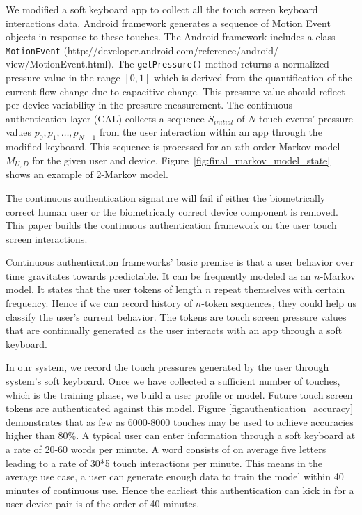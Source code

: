 \documentclass{acm_proc_article-sp}
\begin{document}
We modified a soft keyboard app to collect all the touch screen keyboard interactions data.
Android framework generates a sequence of Motion Event objects in response to these touches.
The Android framework includes a class {\tt MotionEvent} (http://developer.android.com/reference/android/\\view/MotionEvent.html). The {\tt getPressure()} method returns a normalized pressure value in the
range $[0,1]$ which is derived from the quantification of the current flow change due to
capacitive change. This pressure value
should reflect per device variability in the pressure measurement.
The continuous authentication layer (CAL) collects a sequence $S_{initial}$ of $N$ touch events' pressure
values $p_0, p_1, \dots , p_{N-1}$ from the user interaction within an app through the modified keyboard.
This sequence is processed for an $n$th order Markov model $M_{U, D}$ for the given user and device.
Figure~\ref{fig:final_markov_model_state} shows an example of 2-Markov model.






The continuous authentication signature will fail if either the biometrically correct human user
or the biometrically correct device component is removed.
This paper builds the continuous authentication framework on the user touch screen interactions.

Continuous authentication frameworks' basic premise is that a user behavior over time gravitates
towards  predictable. It can be frequently modeled as an $n$-Markov model. It states that the
user tokens of length $n$ repeat themselves with certain frequency. Hence if we can record history
of $n$-token sequences, they could help us classify the user's current behavior. The tokens are
touch screen pressure values that are continually generated as the user interacts with an app
through a soft keyboard.


In our system, we record the touch pressures generated by the user through system's soft keyboard. Once we have collected a sufficient number of touches, which is the training phase, we build 
a user profile or model. Future touch screen tokens are authenticated against this model. Figure \ref{fig:authentication_accuracy} demonstrates that as few as 6000-8000 touches may be used to achieve accuracies higher than 80\%.
A typical user can enter information through a soft keyboard at a rate of 20-60 words per minute. 
A word consists of on average five letters  leading to a rate of 30*5 touch interactions per minute.
This means in the average use case, a user can generate enough data to train
the model within 40 minutes of continuous use. Hence the earliest this authentication can kick in
for a user-device pair is of the order of 40 minutes.
\end{document}
